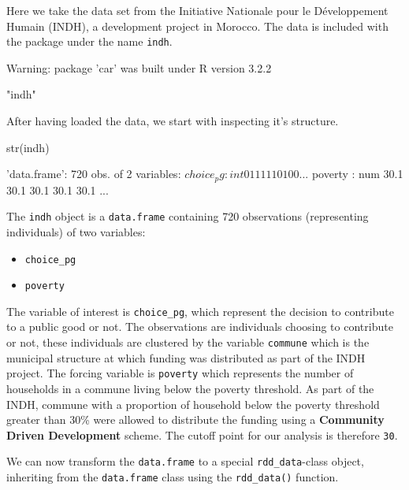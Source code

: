 \documentclass[article]{jss}
\begin{document}
Here we take the data set from the Initiative Nationale pour le
Développement Humain (INDH), a development project in Morocco. The data
is included with the package under the name \texttt{indh}.

\begin{CodeChunk}
\begin{CodeOutput}
Warning: package 'car' was built under R version 3.2.2
\end{CodeOutput}
\begin{CodeOutput}
[1] "indh"
\end{CodeOutput}
\end{CodeChunk}

After having loaded the data, we start with inspecting it's structure.

\begin{CodeChunk}
\begin{CodeInput}
str(indh)
\end{CodeInput}
\begin{CodeOutput}
'data.frame':   720 obs. of  2 variables:
 $ choice_pg: int  0 1 1 1 1 1 0 1 0 0 ...
 $ poverty  : num  30.1 30.1 30.1 30.1 30.1 ...
\end{CodeOutput}
\end{CodeChunk}

The \texttt{indh} object is a \texttt{data.frame} containing 720
observations (representing individuals) of two variables:

\begin{itemize}
\itemsep1pt\parskip0pt
\item
  \texttt{choice\_pg}
\item
  \texttt{poverty}
\end{itemize}

The variable of interest is \texttt{choice\_pg}, which represent the
decision to contribute to a public good or not. The observations are
individuals choosing to contribute or not, these individuals are
clustered by the variable \texttt{commune} which is the municipal
structure at which funding was distributed as part of the INDH project.
The forcing variable is \texttt{poverty} which represents the number of
households in a commune living below the poverty threshold. As part of
the INDH, commune with a proportion of household below the poverty
threshold greater than 30\% were allowed to distribute the funding using
a \textbf{Community Driven Development} scheme. The cutoff point for our
analysis is therefore \texttt{30}.

We can now transform the \texttt{data.frame} to a special
\texttt{rdd\_data}-class object, inheriting from the \texttt{data.frame}
class using the \texttt{rdd\_data()} function.
\end{document}
